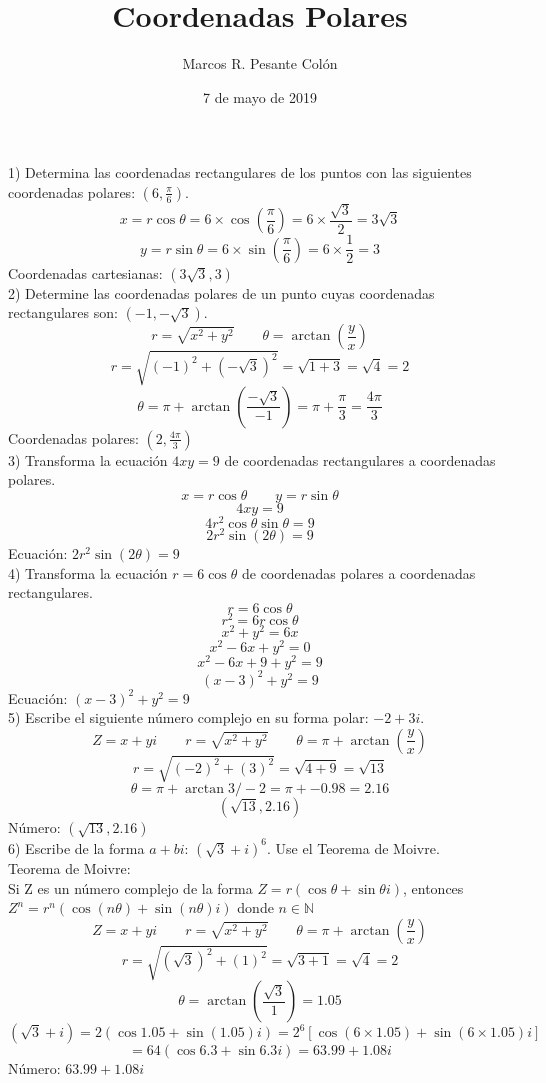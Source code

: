 \documentclass[12pt]{article}
\title{Coordenadas Polares}
\author{Marcos R. Pesante Colón}
\date{7 de mayo de 2019}
\begin{document}
\maketitle

1) Determina las coordenadas rectangulares de los puntos con las siguientes coordenadas polares: $(6,\frac{\pi}{6})$.
$$x = r\cos{\theta} = 6 \times \cos{\left(\frac{\pi}{6}\right)} = 6 \times \frac{\sqrt{3}}{2} = 3\sqrt{3}$$
$$y = r\sin{\theta} = 6 \times \sin{\left(\frac{\pi}{6}\right)} = 6 \times \frac{1}{2} = 3$$
{\centering
    Coordenadas cartesianas: $(3\sqrt{3}, 3)$
}
\\

2) Determine las coordenadas polares de un punto cuyas coordenadas rectangulares son: $(-1, -\sqrt{3})$.
$$r = \sqrt{x^2 +y^2} \qquad \theta = \arctan{\left(\frac{y}{x}\right)}$$
$$r = \sqrt{(-1)^2 + (-\sqrt{3})^2} = \sqrt{1 + 3} = \sqrt{4} = 2$$
$$\theta = \pi + \arctan{\left(\frac{-\sqrt{3}}{-1}\right)} = \pi + \frac{\pi}{3} = \frac{4\pi}{3}$$
{\centering
    Coordenadas polares: $(2, \frac{4\pi}{3})$
}
\\

3) Transforma la ecuación $4xy = 9$ de coordenadas rectangulares a coordenadas polares.
$$x = r\cos{\theta}\qquad y = r\sin{\theta}$$
$$4xy = 9$$
$$4r^2\cos{\theta}\sin{\theta} = 9$$
$$2r^2\sin{(2\theta)} = 9$$
{\centering
    Ecuación: $2r^2\sin{(2\theta)} = 9$
}
\\

4) Transforma la ecuación $r = 6\cos{\theta}$ de coordenadas polares a coordenadas rectangulares.
$$r = 6\cos{\theta}$$
$$r^2 = 6r\cos{\theta}$$
$$x^2 + y^2 = 6x$$
$$x^2 - 6x + y^2 = 0$$
$$x^2 - 6x + 9 + y^2 = 9$$
$$(x-3)^2 + y^2 = 9$$
{\centering
    Ecuación: $(x-3)^2 + y^2 = 9$
}
\\

5) Escribe el siguiente número complejo en su forma polar: $-2 + 3i$.
$$Z = x + yi \qquad r = \sqrt{x^2 + y^2} \qquad \theta = \pi + \arctan{(\frac{y}{x})}$$
$$r = \sqrt{(-2)^2 + (3)^2} = \sqrt{4 + 9} = \sqrt{13}$$
$$\theta = \pi + \arctan{3/-2} = \pi + -0.98 = 2.16$$
$$(\sqrt{13}, 2.16)$$
{\centering
    Número: $(\sqrt{13}, 2.16)$
}
\\

6) Escribe de la forma $a + bi$: $(\sqrt{3}+i)^6$.  Use el Teorema de Moivre.
\\
{\centering
Teorema de Moivre:\\
}
    Si Z es un número complejo de la forma $Z = r(\cos{\theta} + \sin{\theta}i)$, entonces $Z^n = r^n(\cos{(n\theta)} + \sin{(n\theta)}i)$ donde $ n \in \mathbb{N}$
$$Z = x + yi \qquad r = \sqrt{x^2 + y^2} \qquad \theta = \pi + \arctan{(\frac{y}{x})}$$
$$r = \sqrt{(\sqrt{3})^2 + (1)^2} = \sqrt{3 + 1} = \sqrt{4} = 2$$
$$\theta = \arctan{\left(\frac{\sqrt{3}}{1}\right)} = 1.05$$
$$(\sqrt{3} + i) = 2(\cos{1.05} + \sin{(1.05)}i) = 2^6\left[\cos{(6\times 1.05)} + \sin{(6\times 1.05)}i\right]$$
$$ = 64\left(\cos{6.3} + \sin{6.3}i\right) = 63.99 + 1.08i$$
{\centering
    Número: $63.99 + 1.08i$
}
\\
\\
\end{document}
